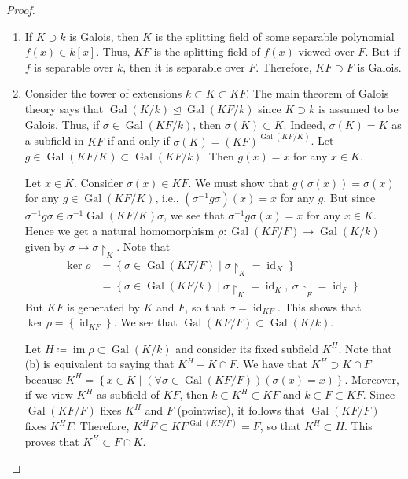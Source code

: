 \documentclass[10pt,letterpaper,cm]{nupset}
\theoremstyle{definition}
\theoremstyle{theorem}
\theoremstyle{remark}
\newcommand{\1}{\mathbf{1}}
\newcommand{\0}{\vec 0}
\DeclareMathOperator{\id}{id}
\DeclareMathOperator{\gal}{Gal}
\DeclareMathOperator{\im}{im}
\begin{document}
\begin{proof} $ $
\begin{enumerate}[label=(\alph*)]
\item  If $K\supset k$ is Galois, then $K$ is the splitting field of some separable polynomial $f(x) \in k[x]$. Thus, $KF$ is the splitting field of $f(x)$ viewed over $F$. But if $f$ is separable over $k$, then it is separable over $F$. Therefore, $KF \supset F$ is Galois.
\item Consider the tower of extensions $k \subset K \subset KF$. The main theorem of Galois theory says that $\gal(K/k) \unlhd \gal(KF/k)$ since $K\supset k$ is assumed to be Galois. Thus, if $\sigma \in \gal(KF/k)$, then $\sigma(K) \subset K$. Indeed, $\sigma(K) = K$ as a subfield in $KF$ if and only if $\sigma(K) = \left(KF\right)^{\gal(KF/K)}$. Let $g\in \gal(KF/K) \subset \gal(KF/k)$. Then $g(x) = x$ for any $x\in K$. 

Let $x\in K$. Consider $\sigma(x) \in KF$.  We must show that $g(\sigma(x)) = \sigma(x)$ for any $g \in \gal(KF/K)$, i.e., $\left(\sigma^{-1}{g}{\sigma}\right)(x) = x$ for any $g$. But since $\sigma^{-1}{g}{\sigma} \in \sigma^{-1}{\gal(KF/K)}{\sigma}$, we see that $\sigma^{-1}{g}{\sigma}(x) = x$ for any $x\in K$. Hence we get a natural homomorphism $ \rho : \gal(KF/F) \to \gal(K/k)$ given by $\sigma \mapsto \sigma \restriction_K$.  Note that \begin{align*} \ker{\rho} & = \left\{\sigma \in \gal(KF/F) \mid \sigma \restriction_K = \id_K\right\}
\\ & = \left\{\sigma \in \gal(KF/k) \mid \sigma \restriction_K = \id_K, \ \sigma \restriction_F = \id_F\right\}.
\end{align*}  But $KF$ is generated by $K$ and $F$, so that $\sigma = \id_{KF}$. This shows that $\ker{\rho} = \left\{\id_{KF}\right\}$. We see that $\gal(KF/F) \subset \gal(K/k)$. 

Let $H \coloneqq  \im{\rho} \subset \gal(K/k)$ and consider its fixed subfield $K^H$. Note that (b) is equivalent to saying that $K^H - K \cap F$. We have that $K^H \supset K \cap F$ because $K^H = \left\{x\in K \mid \left(\forall \sigma \in \gal(KF/F)\right)\left(\sigma(x) =x\right)\right\}$. Moreover, if we view $K^H$ as subfield of $KF$, then $k \subset K^H \subset KF$ and $k \subset F \subset KF$.  Since $\gal(KF/F)$ fixes $K^H$ and $F$ (pointwise), it follows that $\gal(KF/F)$ fixes $K^HF$. Therefore, $K^HF \subset KF^{\gal(KF/F)} = F$, so that $K^H \subset H$. This proves that $K^H \subset F \cap K$. 
\end{enumerate}
\end{proof}
\end{document}
